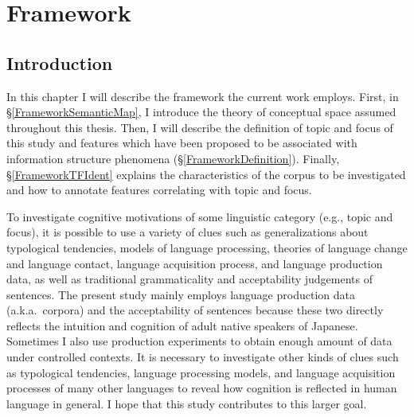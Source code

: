 \chapter{Framework}\label{Framework}


\section{Introduction}\label{FrameworkIntro}

In this chapter I will describe the framework the current work employs.
First, in \S \ref{FrameworkSemanticMap},
I introduce the theory of conceptual space assumed throughout this thesis.
Then, I will describe
the definition of topic and focus of this study and 
features which have been proposed to be associated with information structure phenomena (\S \ref{FrameworkDefinition}).
Finally,
\S \ref{FrameworkTFIdent} explains the characteristics of the corpus to be investigated and how to annotate features correlating with topic and focus.

To investigate cognitive motivations of some linguistic category (e.g., topic and focus),
it is possible to use a variety of clues such as generalizations about typological tendencies, models of language processing, theories of language change and language contact, language acquisition process, and language production data, as well as traditional grammaticality and acceptability judgements of sentences.
The present study mainly employs language production data (a.k.a.\ corpora) and
the acceptability of sentences
because these two directly reflects the intuition and cognition of adult native speakers of Japanese.
Sometimes I also use production experiments to obtain enough amount of data
under controlled contexts.
It is necessary to investigate other kinds of clues such as typological tendencies, language processing models, and language acquisition processes of many other languages
to reveal how cognition is reflected in human language in general.
I hope that this study contributes to this larger goal.

